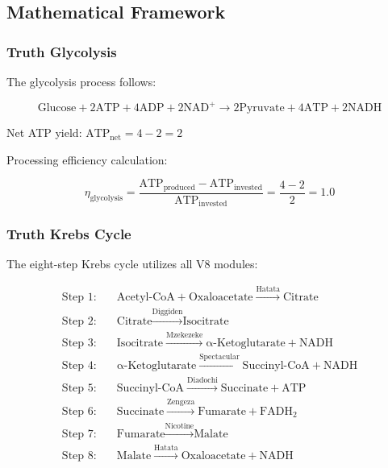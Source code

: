 \documentclass[12pt,a4paper]{article}
\begin{document}
\subsection{Mathematical Framework}

\subsubsection{Truth Glycolysis}

The glycolysis process follows:

\begin{equation}
\text{Glucose} + 2\text{ATP} + 4\text{ADP} + 2\text{NAD}^+ \rightarrow 2\text{Pyruvate} + 4\text{ATP} + 2\text{NADH}
\end{equation}

Net ATP yield: $\text{ATP}_{\text{net}} = 4 - 2 = 2$

Processing efficiency calculation:

\begin{equation}
\eta_{\text{glycolysis}} = \frac{\text{ATP}_{\text{produced}} - \text{ATP}_{\text{invested}}}{\text{ATP}_{\text{invested}}} = \frac{4 - 2}{2} = 1.0
\end{equation}

\subsubsection{Truth Krebs Cycle}

The eight-step Krebs cycle utilizes all V8 modules:

\begin{align}
\text{Step 1:} \quad &\text{Acetyl-CoA} + \text{Oxaloacetate} \xrightarrow{\text{Hatata}} \text{Citrate} \\
\text{Step 2:} \quad &\text{Citrate} \xrightarrow{\text{Diggiden}} \text{Isocitrate} \\
\text{Step 3:} \quad &\text{Isocitrate} \xrightarrow{\text{Mzekezeke}} \text{α-Ketoglutarate} + \text{NADH} \\
\text{Step 4:} \quad &\text{α-Ketoglutarate} \xrightarrow{\text{Spectacular}} \text{Succinyl-CoA} + \text{NADH} \\
\text{Step 5:} \quad &\text{Succinyl-CoA} \xrightarrow{\text{Diadochi}} \text{Succinate} + \text{ATP} \\
\text{Step 6:} \quad &\text{Succinate} \xrightarrow{\text{Zengeza}} \text{Fumarate} + \text{FADH}_2 \\
\text{Step 7:} \quad &\text{Fumarate} \xrightarrow{\text{Nicotine}} \text{Malate} \\
\text{Step 8:} \quad &\text{Malate} \xrightarrow{\text{Hatata}} \text{Oxaloacetate} + \text{NADH}
\end{align}
\end{document}
